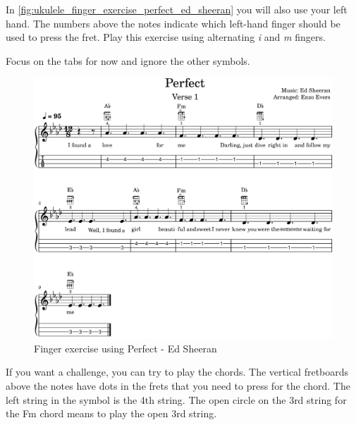 In \autoref{fig:ukulele_finger_exercise_perfect_ed_sheeran} you will also use your left hand. The numbers above the notes indicate which left-hand finger should be used to press the fret. Play this exercise using alternating \textit{i} and \textit{m} fingers.

Focus on the tabs for now and ignore the other symbols.

\begin{figure}[h]
	\centering
	\includegraphics[width=\textwidth]{../../MuseScore/Ukulele/UkulelePerfectEdSheeranSingleNotesFirstVerse.png}
	\caption{Finger exercise using Perfect - Ed Sheeran}
	\label{fig:ukulele_finger_exercise_perfect_ed_sheeran}
\end{figure}

If you want a challenge, you can try to play the chords. The vertical fretboards above the notes have dots in the frets that you need to press for the chord. The left string in the symbol is the 4th string. The open circle on the 3rd string for the Fm chord means to play the open 3rd string.